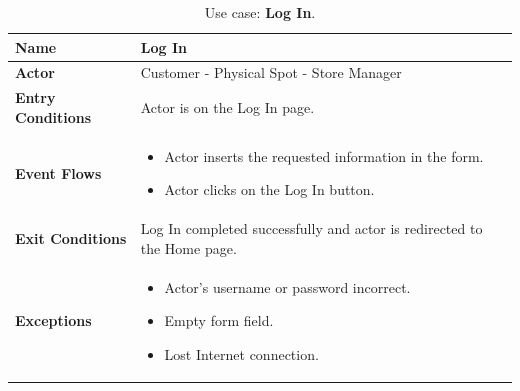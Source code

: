 \begin{table}[H]
    \centering
    \begin{tabular}{| m{} | m{} |}
        \hline
        \textbf{Name}            & Log In                                                                  \\
        \hline
        \textbf{Actor}            & Customer - Physical Spot - Store Manager                                \\
        \hline
        \textbf{Entry Conditions} & Actor is on the Log In page.                                            \\
        \hline
        \textbf{Event Flows} &
        \begin{itemize}
            \item Actor inserts the requested information in the form.
            \item Actor clicks on the Log In button.
        \end{itemize} \\
        \hline
        \textbf{Exit Conditions}  & Log In completed successfully and actor is redirected to the Home page. \\
        \hline
        \textbf{Exceptions} &
        \begin{itemize}
            \item Actor's username or password incorrect.
            \item Empty form field.
            \item Lost Internet connection.
        \end{itemize} \\
        \hline
    \end{tabular}
    \caption{Use case: \textbf{Log In}.}
    \label{tableLogIn}
\end{table}

